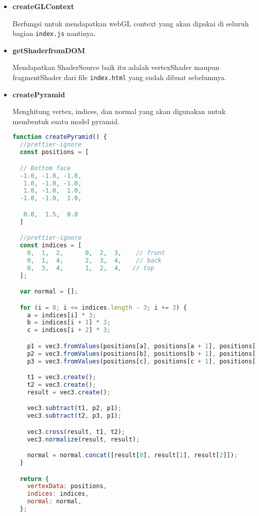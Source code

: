 \begin{itemize}
  \item \textbf{createGLContext}

        Berfungsi untuk mendapatkan webGL context yang akan dipakai di seluruh bagian \texttt{index.js} nantinya.

  \item \textbf{getShaderfromDOM}

        Mendapatkan ShaderSource baik itu adalah vertexShader maupun fragmentShader dari file \texttt{index.html} yang sudah dibuat sebelumnya.

  \item \textbf{createPyramid}

        Menghitung vertex, indices, dan normal yang akan digunakan untuk membentuk suatu model pyramid.


        \begin{lstlisting}[language=javascript, label={lst: createSphere}, caption={fungsi createPyramid}]
function createPyramid() {
  //prettier-ignore
  const positions = [

  // Bottom face
  -1.0, -1.0, -1.0,
   1.0, -1.0, -1.0,
   1.0, -1.0,  1.0,
  -1.0, -1.0,  1.0,

   0.0,  1.5,  0.0
  ]

  //prettier-ignore
  const indices = [
    0,  1,  2,      0,  2,  3,    // front
    0,  1,  4,      2,  3,  4,    // back
    0,  3,  4,      1,  2,  4,   // top
  ];

  var normal = [];

  for (i = 0; i <= indices.length - 3; i += 3) {
    a = indices[i] * 3;
    b = indices[i + 1] * 3;
    c = indices[i + 2] * 3;

    p1 = vec3.fromValues(positions[a], positions[a + 1], positions[a + 2]);
    p2 = vec3.fromValues(positions[b], positions[b + 1], positions[b + 2]);
    p3 = vec3.fromValues(positions[c], positions[c + 1], positions[c + 2]);

    t1 = vec3.create();
    t2 = vec3.create();
    result = vec3.create();

    vec3.subtract(t1, p2, p1);
    vec3.subtract(t2, p3, p1);

    vec3.cross(result, t1, t2);
    vec3.normalize(result, result);

    normal = normal.concat([result[0], result[1], result[2]]);
  }

  return {
    vertexData: positions,
    indices: indices,
    normal: normal,
  };

\end{lstlisting}

\end{itemize}

